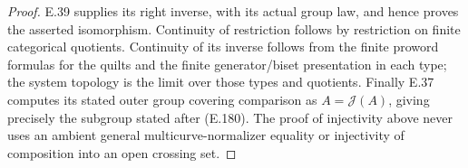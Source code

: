 \begin{proof}
E.39 supplies its right inverse, with its actual group law,
and hence proves the asserted isomorphism.  Continuity of
restriction follows by restriction on finite categorical
quotients.  Continuity of its inverse follows from the
finite proword formulas for the quilts and the finite
generator/biset presentation in each type; the system
topology is the limit over those types and quotients.
Finally E.37 computes its stated outer group covering comparison as
$A=\mathcal J(A)$, giving precisely the subgroup stated
after (E.180).  The proof of injectivity above never uses
an ambient general multicurve-normalizer equality or
injectivity of composition into an open crossing set.
\end{proof}
